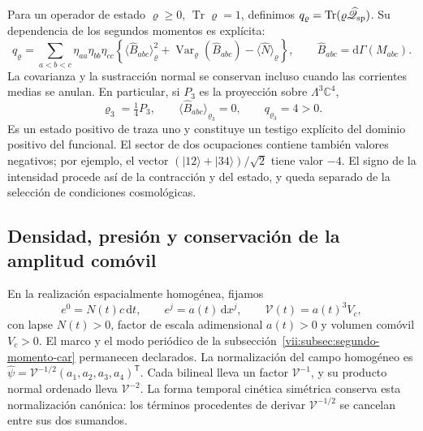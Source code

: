 Para un operador de estado \(\varrho\geq0\),
\(\operatorname{Tr}\varrho=1\), definimos
\(q_\varrho=\operatorname{Tr}(\varrho\widehat{\mathscr Q}_{\rm sp})\).
Su dependencia de los segundos momentos es explícita:
\begin{equation}
 q_\varrho=\sum_{a<b<c}\eta_{aa}\eta_{bb}\eta_{cc}
 \left\{
  \langle\widehat B_{abc}\rangle_\varrho^2
  +\operatorname{Var}_\varrho(\widehat B_{abc})
  -\langle\widehat N\rangle_\varrho
 \right\},\qquad
 \widehat B_{abc}=\mathrm d\Gamma(M_{abc}).
 \label{vii:eq:covarianza-espin-material}
\end{equation}
La covarianza y la sustracción normal se conservan incluso cuando
las corrientes medias se anulan. En particular, si \(P_3\) es la
proyección sobre \(\Lambda^3\mathbb C^4\),
\begin{equation}
 \varrho_3=\tfrac14P_3,\qquad
 \langle\widehat B_{abc}\rangle_{\varrho_3}=0,\qquad
 q_{\varrho_3}=4>0.
 \label{vii:eq:testigo-positivo-espin}
\end{equation}
Es un estado positivo de traza uno y constituye un testigo explícito
del dominio positivo del funcional. El sector de dos ocupaciones
contiene también valores negativos; por ejemplo, el vector
\((|12\rangle+|34\rangle)/\sqrt2\) tiene valor \(-4\).
El signo de la intensidad procede así de la contracción y del
estado, y queda separado de la selección de condiciones cosmológicas.

\subsection{Densidad, presión y conservación de la amplitud comóvil}
\label{vii:subsec:amplitud-espinorial-comovil}

En la realización espacialmente homogénea, fijamos
\[
 e^0=N(t)c\,\mathrm dt,\qquad e^j=a(t)\,\mathrm dx^j,
 \qquad \mathcal V(t)=a(t)^3V_c,
\]
con lapse \(N(t)>0\), factor de escala adimensional \(a(t)>0\)
y volumen comóvil \(V_c>0\). El marco y el modo periódico de la
subsección~\ref{vii:subsec:segundo-momento-car} permanecen declarados.
La normalización del campo homogéneo es
\(\widehat\psi=\mathcal V^{-1/2}(a_1,a_2,a_3,a_4)^{\mathsf T}\).
Cada bilineal lleva un factor \(\mathcal V^{-1}\), y su producto
normal ordenado lleva \(\mathcal V^{-2}\). La forma temporal
cinética simétrica conserva esta normalización canónica: los términos
procedentes de derivar \(\mathcal V^{-1/2}\) se cancelan entre
sus dos sumandos.

